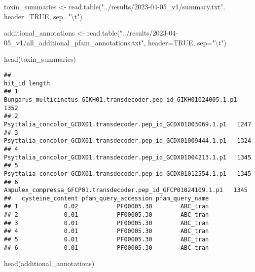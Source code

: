 \documentclass[
]{article}
\newenvironment{Shaded}{\begin{snugshade}}{\end{snugshade}}
\newcommand{\AttributeTok}[1]{\textcolor[rgb]{0.77,0.63,0.00}{#1}}
\newcommand{\ConstantTok}[1]{\textcolor[rgb]{0.00,0.00,0.00}{#1}}
\newcommand{\FunctionTok}[1]{\textcolor[rgb]{0.00,0.00,0.00}{#1}}
\newcommand{\NormalTok}[1]{#1}
\newcommand{\OtherTok}[1]{\textcolor[rgb]{0.56,0.35,0.01}{#1}}
\newcommand{\SpecialCharTok}[1]{\textcolor[rgb]{0.00,0.00,0.00}{#1}}
\newcommand{\StringTok}[1]{\textcolor[rgb]{0.31,0.60,0.02}{#1}}
\begin{document}
\begin{Shaded}
\begin{Highlighting}[]
\NormalTok{toxin\_summaries }\OtherTok{\textless{}{-}} \FunctionTok{read.table}\NormalTok{(}\StringTok{"../results/2023{-}04{-}05\_v1/summary.txt"}\NormalTok{, }\AttributeTok{header=}\ConstantTok{TRUE}\NormalTok{, }\AttributeTok{sep=}\StringTok{"}\SpecialCharTok{\textbackslash{}t}\StringTok{"}\NormalTok{)}

\NormalTok{additional\_annotations }\OtherTok{\textless{}{-}} \FunctionTok{read.table}\NormalTok{(}\StringTok{"../results/2023{-}04{-}05\_v1/all\_additional\_pfam\_annotations.txt"}\NormalTok{, }\AttributeTok{header=}\ConstantTok{TRUE}\NormalTok{, }\AttributeTok{sep=}\StringTok{"}\SpecialCharTok{\textbackslash{}t}\StringTok{"}\NormalTok{)}

\FunctionTok{head}\NormalTok{(toxin\_summaries)}
\end{Highlighting}
\end{Shaded}

\begin{verbatim}
##                                                               hit_id length
## 1 Bungarus_multicinctus_GIKH01.transdecoder.pep_id_GIKH01024005.1.p1   1352
## 2    Psyttalia_concolor_GCDX01.transdecoder.pep_id_GCDX01003069.1.p1   1247
## 3    Psyttalia_concolor_GCDX01.transdecoder.pep_id_GCDX01009444.1.p1   1324
## 4    Psyttalia_concolor_GCDX01.transdecoder.pep_id_GCDX01004213.1.p1   1345
## 5    Psyttalia_concolor_GCDX01.transdecoder.pep_id_GCDX01012554.1.p1   1345
## 6     Ampulex_compressa_GFCP01.transdecoder.pep_id_GFCP01024109.1.p1   1345
##   cysteine_content pfam_query_accession pfam_query_name
## 1             0.02           PF00005.30        ABC_tran
## 2             0.01           PF00005.30        ABC_tran
## 3             0.01           PF00005.30        ABC_tran
## 4             0.01           PF00005.30        ABC_tran
## 5             0.01           PF00005.30        ABC_tran
## 6             0.01           PF00005.30        ABC_tran
\end{verbatim}

\begin{Shaded}
\begin{Highlighting}[]
\FunctionTok{head}\NormalTok{(additional\_annotations)}
\end{Highlighting}
\end{Shaded}
\end{document}
